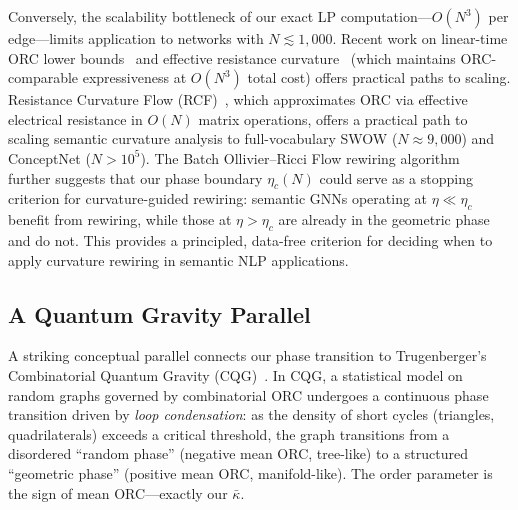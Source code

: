 \documentclass[11pt,a4paper]{article}
\newcommand{\kbar}{\bar{\kappa}}
\newcommand{\etac}{\eta_c}
\begin{document}
Conversely, the scalability bottleneck of our exact LP computation---$O(N^3)$ per edge---limits application to networks with $N \lesssim 1{,}000$. Recent work on linear-time ORC lower bounds~\cite{kang2024accelerated} and effective resistance curvature~\cite{erc2025efficient} (which maintains ORC-comparable expressiveness at $O(N^3)$ total cost) offers practical paths to scaling. Resistance Curvature Flow (RCF)~\cite{fei2026dynamic}, which approximates ORC via effective electrical resistance in $O(N)$ matrix operations, offers a practical path to scaling semantic curvature analysis to full-vocabulary SWOW ($N \approx 9{,}000$) and ConceptNet ($N > 10^5$). The Batch Ollivier--Ricci Flow rewiring algorithm~\cite{nguyen2023borf} further suggests that our phase boundary $\etac(N)$ could serve as a stopping criterion for curvature-guided rewiring: semantic GNNs operating at $\eta \ll \etac$ benefit from rewiring, while those at $\eta > \etac$ are already in the geometric phase and do not. This provides a principled, data-free criterion for deciding when to apply curvature rewiring in semantic NLP applications.

\subsection{A Quantum Gravity Parallel}
\label{sec:qgravity}

A striking conceptual parallel connects our phase transition to Trugenberger's Combinatorial Quantum Gravity (CQG)~\cite{trugenberger2017combinatorial,trugenberger2025review}. In CQG, a statistical model on random graphs governed by combinatorial ORC undergoes a continuous phase transition driven by \emph{loop condensation}: as the density of short cycles (triangles, quadrilaterals) exceeds a critical threshold, the graph transitions from a disordered ``random phase'' (negative mean ORC, tree-like) to a structured ``geometric phase'' (positive mean ORC, manifold-like). The order parameter is the sign of mean ORC---exactly our $\kbar$.
\end{document}
